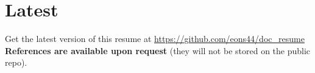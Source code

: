 \documentclass[letterpaper]{twentysecondcv} %
\begin{document}

\section{Latest}

Get the latest version of this resume at \href{https://github.com/eons44/doc\_resume}{https://github.com/eons44/doc\_resume}
\textbf{References are available upon request} (they will not be stored on the public repo).
\end{document}
